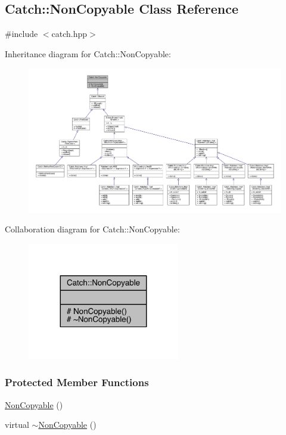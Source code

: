 \hypertarget{a00054}{}\subsection{Catch\+:\+:Non\+Copyable Class Reference}
\label{a00054}


{\ttfamily \#include $<$catch.\+hpp$>$}



Inheritance diagram for Catch\+:\+:Non\+Copyable\+:\nopagebreak
\begin{figure}[H]
\begin{center}
\leavevmode
\includegraphics[width=350pt]{a00237}
\end{center}
\end{figure}


Collaboration diagram for Catch\+:\+:Non\+Copyable\+:\nopagebreak
\begin{figure}[H]
\begin{center}
\leavevmode
\includegraphics[width=188pt]{a00238}
\end{center}
\end{figure}
\subsubsection*{Protected Member Functions}
\begin{DoxyCompactItemize}
\item 
\hyperlink{a00054_a4b492dd5753f9952350fb64dc6cb9fe2}{Non\+Copyable} ()
\item 
virtual \hyperlink{a00054_a81254677280fef337eb4a676e91e3293}{$\sim$\+Non\+Copyable} ()
\end{DoxyCompactItemize}


